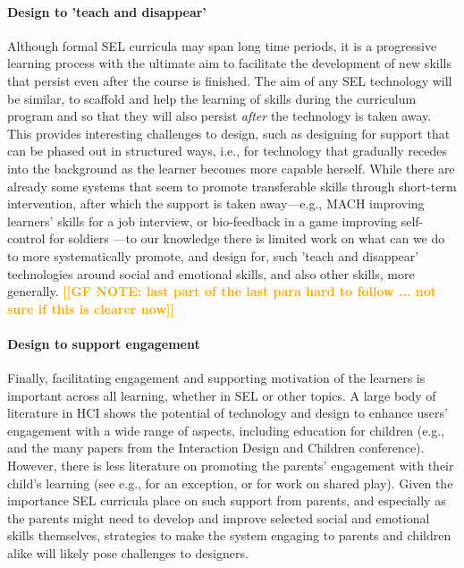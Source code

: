 \documentclass[prodmode,acmtochi]{acmsmall}
\newcommand{\Geraldine}[1]{\textrm{\textbf{\textcolor{Orange}{[[#1]]}}}}
\begin{document}
\paragraph{Design to 'teach and disappear'} Although formal SEL curricula may span long time periods, it is a progressive learning process with the ultimate aim to facilitate the development of new skills that persist even after the course is finished. The aim of any SEL technology will be similar, to scaffold and help the learning of skills during the curriculum program and so that they will also persist \emph{after} the technology is taken away. This provides interesting  challenges to design, such as designing for support that can be phased out in structured ways, i.e., for technology that gradually recedes into the background as the learner becomes more capable herself. 
%
While there are already some systems that seem to promote transferable skills through short-term intervention, after which the support is taken away---e.g., MACH \cite{Hoque2013} improving learners' skills for a job interview, or bio-feedback in a game improving self-control for soldiers \cite{Bouchard2012}---to  our knowledge there is limited work on what can we do to more systematically promote, and design for, such 'teach and disappear' technologies around social and emotional skills, and also other skills, more generally. 
\Geraldine{GF NOTE: last part of the last para hard to follow ... not sure if this is clearer now}

\paragraph{Design to support engagement} Finally, facilitating engagement and supporting motivation of the learners is important across all learning, whether in SEL or other topics. A large body of literature in HCI shows the potential of technology and design to enhance users' engagement with a wide range of aspects, including education for children (e.g., \cite{Connolly2012,Bers2010} and the many papers from the Interaction Design and Children conference). However, there is less literature on promoting the parents' engagement with their child's learning (see e.g., \cite{Lewin2010} for an exception, or \cite{Raffle2010} for work on shared play). Given the importance SEL curricula place on such support from parents, and especially as the parents might need to develop and improve selected social and emotional skills themselves, strategies to make the system engaging to parents and children alike will likely pose challenges to designers.
\end{document}
